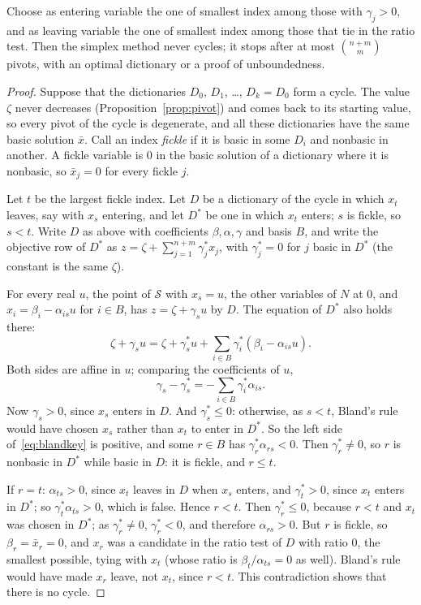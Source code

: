 \begin{theorem}[Bland, 1977]\label{thm:bland}
Choose as entering variable the one of smallest index among those with $\gamma_j>0$, and as leaving variable the one of smallest index among those that tie in the ratio test. Then the simplex method never
cycles; it stops after at most $\binom{n+m}{m}$ pivots, with an optimal dictionary or a proof of unboundedness.
\end{theorem}
\begin{proof}
Suppose that the dictionaries $D_0$, $D_1$, \dots, $D_k=D_0$ form a cycle. The value $\zeta$ never decreases (Proposition~\ref{prop:pivot}) and comes back to its starting value, so every pivot of the cycle is degenerate, and
all these dictionaries have the same basic solution $\bar x$. Call an index \emph{fickle} if it is basic in some $D_i$ and nonbasic in another. A fickle variable is $0$ in the basic solution of a dictionary where it is nonbasic,
so $\bar x_j=0$ for every fickle $j$.

Let $t$ be the largest fickle index. Let $D$ be a dictionary of the cycle in which $x_t$ leaves, say with $x_s$ entering, and let $D^*$ be one in which $x_t$ enters; $s$ is fickle, so $s<t$. Write $D$ as above with
coefficients $\beta,\alpha,\gamma$ and basis $B$, and write the objective row of $D^*$ as $z=\zeta+\sum_{j=1}^{n+m}\gamma^*_jx_j$, with $\gamma^*_j=0$ for $j$ basic in $D^*$ (the constant is the same $\zeta$).

For every real $u$, the point of $\mathcal S$ with $x_s=u$, the other variables of $N$ at $0$, and $x_i=\beta_i-\alpha_{is}u$ for $i\in B$, has $z=\zeta+\gamma_su$ by $D$. The equation of $D^*$ also holds there:
\[
\zeta+\gamma_su=\zeta+\gamma^*_su+\sum_{i\in B}\gamma^*_i(\beta_i-\alpha_{is}u).
\]
Both sides are affine in $u$; comparing the coefficients of $u$,
\begin{equation}\label{eq:blandkey}
\gamma_s-\gamma^*_s=-\sum_{i\in B}\gamma^*_i\alpha_{is}.
\end{equation}
Now $\gamma_s>0$, since $x_s$ enters in $D$. And $\gamma^*_s\le0$: otherwise, as $s<t$, Bland's rule would have chosen $x_s$ rather than $x_t$ to enter in $D^*$. So the left side of~\eqref{eq:blandkey} is positive, and
some $r\in B$ has $\gamma^*_r\alpha_{rs}<0$. Then $\gamma^*_r\ne0$, so $r$ is nonbasic in $D^*$ while basic in $D$: it is fickle, and $r\le t$.

If $r=t$: $\alpha_{ts}>0$, since $x_t$ leaves in $D$ when $x_s$ enters, and $\gamma^*_t>0$, since $x_t$ enters in $D^*$; so $\gamma^*_t\alpha_{ts}>0$, which is false. Hence $r<t$. Then $\gamma^*_r\le0$, because $r<t$ and $x_t$ was chosen
in $D^*$; as $\gamma^*_r\ne0$, $\gamma^*_r<0$, and therefore $\alpha_{rs}>0$. But $r$ is fickle, so $\beta_r=\bar x_r=0$, and $x_r$ was a candidate in the ratio test of $D$ with ratio $0$, the smallest possible, tying with $x_t$
(whose ratio is $\beta_t/\alpha_{ts}=0$ as well). Bland's rule would have made $x_r$ leave, not $x_t$, since $r<t$. This contradiction shows that there is no cycle.


\end{proof}
